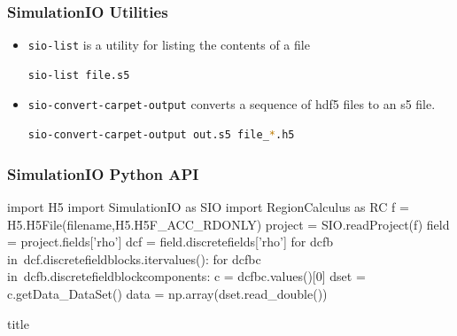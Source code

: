 \documentclass[]{beamer}
\newcommand{\transitionslide}[1]{
  \begin{frame}[plain]
  \vfill
  \centering
  \begin{beamercolorbox}[sep=8pt,center,shadow=true,rounded=true]{title}
    \usebeamerfont{title}{#1}
  \end{beamercolorbox}
  \vfill
\end{frame}
}
\begin{document}
\begin{frame}[fragile]
  \frametitle{SimulationIO Utilities}
  \begin{itemize}
  \item {\color{blue}\lstinline$sio-list$} is a utility for listing the contents of
    a file
\begin{lstlisting}[language=bash]
  sio-list file.s5
\end{lstlisting}
  \item {\color{blue}\lstinline$sio-convert-carpet-output$} converts a
    sequence of hdf5 files to an s5 file.
\begin{lstlisting}[language=bash]
  sio-convert-carpet-output out.s5 file_*.h5
\end{lstlisting}
  \end{itemize}
\end{frame}

\begin{frame}[fragile]
  \frametitle{SimulationIO Python API}
  \begin{python}
    import H5
    import SimulationIO as SIO
    import RegionCalculus as RC
    f = H5.H5File(filename,H5.H5F_ACC_RDONLY)
    project = SIO.readProject(f)
    field = project.fields['rho']
    dcf = field.discretefields['rho']
    for dcfb in\
    dcf.discretefieldblocks.itervalues():
        for dcfbc in\
        dcfb.discretefieldblockcomponents:
            c = dcfbc.values()[0]
            dset = c.getData_DataSet()
            data = np.array(dset.read_double())
  \end{python}
\end{frame}

\transitionslide{\Huge yt}
\end{document}
